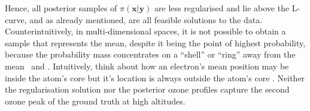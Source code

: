 Hence, all posterior samples of $\pi(\bm{x}| \bm{y})$ are less regularised and lie above the L-curve, and as already mentioned, are all feasible solutions to the data.
Counterintuitively, in multi-dimensional spaces, it is not possible to obtain a sample that represents the mean, despite it being the point of highest probability, because the probability mass concentrates on a “shell” or “ring” away from the mean~\cite{VowelsMultiD} and \cite[Sec.~3.1]{VershyninMultiD2018}.
Intuitively, think about how an electron's mean position may be inside the atom's core but it's location is always outside the atom's core \cite[Fig.~4]{ElectronBessel}.
Neither the regularisation solution nor the posterior ozone profiles capture the second ozone peak of the ground truth at high altitudes.

